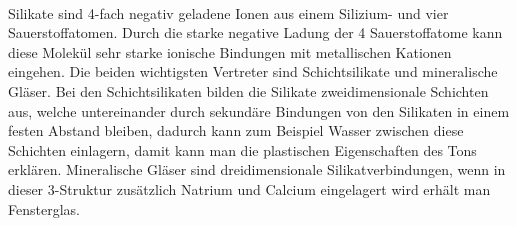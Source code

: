 \documentclass[11pt,a4paper]{article}
\numberwithin{equation}{section}
\numberwithin{figure}{section}
\begin{document}
\\
\begin{addmargin}[25pt]{0pt}    
Silikate sind 4-fach negativ geladene Ionen aus einem Silizium- und vier Sauerstoffatomen. Durch die starke negative Ladung der 4 Sauerstoffatome kann diese Molekül sehr starke ionische Bindungen mit metallischen Kationen eingehen. Die beiden wichtigsten Vertreter sind Schichtsilikate und mineralische Gläser. Bei den Schichtsilikaten bilden die Silikate zweidimensionale Schichten aus, welche untereinander durch sekundäre Bindungen von den Silikaten in einem festen Abstand bleiben, dadurch kann zum Beispiel Wasser zwischen diese Schichten einlagern, damit kann man die plastischen Eigenschaften des Tons erklären. Mineralische Gläser sind dreidimensionale Silikatverbindungen, wenn in dieser 3-Struktur zusätzlich Natrium und Calcium eingelagert wird erhält man Fensterglas.   \\
\end{addmargin}
\end{document}
